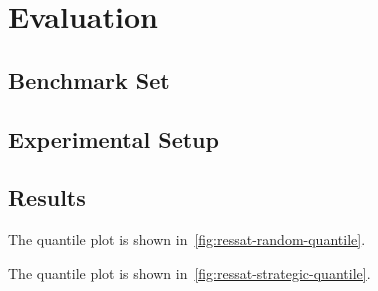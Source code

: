 \section{Evaluation}
\label{sect:ressat-evaluation}

\subsection{Benchmark Set}

\subsection{Experimental Setup}

\subsection{Results}

\begin{figure*}[t]
    \centering
    
    \caption{The quantile plot of random $k$-CNF formulas}
    \label{fig:ressat-random-quantile}
\end{figure*}

The quantile plot is shown in~\cref{fig:ressat-random-quantile}.

\begin{figure*}[t]
    \centering
    
    \caption{The quantile plot of strategic companies formulas}
    \label{fig:ressat-strategic-quantile}
\end{figure*}

The quantile plot is shown in~\cref{fig:ressat-strategic-quantile}.